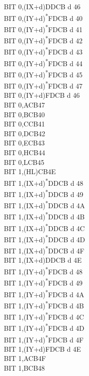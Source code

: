 \documentclass[twoside,openright,a4paper]{book}
\begin{document}
\begin{multicols}{3}
{\begin{tabbing}
	BIT 0,(IX+d)\>DDCB d 46\\
	BIT 0,(IY+d)\textsuperscript{*}\>FDCB d 40\\
	BIT 0,(IY+d)\textsuperscript{*}\>FDCB d 41\\
	BIT 0,(IY+d)\textsuperscript{*}\>FDCB d 42\\
	BIT 0,(IY+d)\textsuperscript{*}\>FDCB d 43\\
	BIT 0,(IY+d)\textsuperscript{*}\>FDCB d 44\\
	BIT 0,(IY+d)\textsuperscript{*}\>FDCB d 45\\
	BIT 0,(IY+d)\textsuperscript{*}\>FDCB d 47\\
	BIT 0,(IY+d)\>FDCB d 46\\
	BIT 0,A\>CB47\\
	BIT 0,B\>CB40\\
	BIT 0,C\>CB41\\
	BIT 0,D\>CB42\\
	BIT 0,E\>CB43\\
	BIT 0,H\>CB44\\
	BIT 0,L\>CB45\\
	BIT 1,(HL)\>CB4E\\
	BIT 1,(IX+d)\textsuperscript{*}\>DDCB d 48\\
	BIT 1,(IX+d)\textsuperscript{*}\>DDCB d 49\\
	BIT 1,(IX+d)\textsuperscript{*}\>DDCB d 4A\\
	BIT 1,(IX+d)\textsuperscript{*}\>DDCB d 4B\\
	BIT 1,(IX+d)\textsuperscript{*}\>DDCB d 4C\\
	BIT 1,(IX+d)\textsuperscript{*}\>DDCB d 4D\\
	BIT 1,(IX+d)\textsuperscript{*}\>DDCB d 4F\\
	BIT 1,(IX+d)\>DDCB d 4E\\
	BIT 1,(IY+d)\textsuperscript{*}\>FDCB d 48\\
	BIT 1,(IY+d)\textsuperscript{*}\>FDCB d 49\\
	BIT 1,(IY+d)\textsuperscript{*}\>FDCB d 4A\\
	BIT 1,(IY+d)\textsuperscript{*}\>FDCB d 4B\\
	BIT 1,(IY+d)\textsuperscript{*}\>FDCB d 4C\\
	BIT 1,(IY+d)\textsuperscript{*}\>FDCB d 4D\\
	BIT 1,(IY+d)\textsuperscript{*}\>FDCB d 4F\\
	BIT 1,(IY+d)\>FDCB d 4E\\
	BIT 1,A\>CB4F\\
	BIT 1,B\>CB48\\

\end{tabbing}}
\end{multicols}
\end{document}
